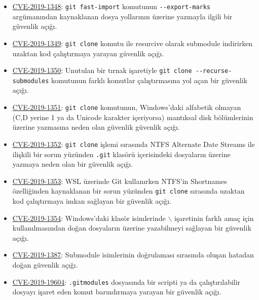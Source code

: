 \documentclass[11pt]{article}
\begin{document}
\begin{itemize}
\item \href{https://github.com/git/git/security/advisories/GHSA-2pw3-gwg9-8pqr}{CVE-2019-1348}: \texttt{git fast-import} komutunun \texttt{-{}-export-marks} argümanından
kaynaklanan dosya yollarının üzerine yazmayla ilgili bir güvenlik açığı.
\item \href{https://github.com/git/git/security/advisories/GHSA-4qvh-qvv7-frc7}{CVE-2019-1349}: \texttt{git clone} komutu ile resurcive olarak submodule indirirken
uzaktan kod çalıştırmaya yarayan güvenlik açığı.
\item \href{https://github.com/git/git/security/advisories/GHSA-44fr-r2hj-3f4x}{CVE-2019-1350}: Unutulan bir tırnak işaretiyle \texttt{git clone
    -{}-recurse-submodules} komutunun farklı komutlar çalıştırmasına yol açan bir
güvenlik açığı.
\item \href{https://github.com/git/git/security/advisories/GHSA-39hj-fvvf-mq4f}{CVE-2019-1351}: \texttt{git clone} komutunun, Windows'daki alfabetik olmayan (C,D
yerine 1 ya da Unicode karakter içeriyorsa) mantıksal disk bölümlerinin
üzerine yazmasına neden olan güvenlik güvenlik açığı.
\item \href{https://github.com/git/git/security/advisories/GHSA-5wph-8frv-58vj}{CVE-2019-1352}: \texttt{git clone} işlemi sırasında NTFS Alternate Date Streams ile
ilişkili bir sorun yüzünden \texttt{.git} klasörü içerisindeki dosyaların üzerine
yazmaya neden olan bir güvenlik açığı.
\item \href{https://github.com/git/git/security/advisories/GHSA-589j-mmg9-733v}{CVE-2019-1353}: WSL üzerinde Git kullanırken NTFS'in Shortnames özelliğinden
kaynaklanan bir sorun yüzünden \texttt{git clone} sırasında uzaktan kod çalıştırmaya
imkan sağlayan bir güvenlik açığı.
\item \href{https://github.com/git/git/security/advisories/GHSA-xjx4-8694-q2fq}{CVE-2019-1354}: Windows'daki klasör isimlerinde $\backslash$ işaretinin farklı amaç için
kullanılmasından doğan dosyaların üzerine yazabilmeyi sağlayan bir güvenlik
açığı.
\item \href{https://github.com/git/git/security/advisories/GHSA-4wfr-gwrh-8mj2}{CVE-2019-1387}: Submodule isimlerinin doğrulaması sırasında oluşan hatadan
doğan güvenlik açığı.
\item \href{https://github.com/git/git/security/advisories/GHSA-cj5c-9839-g2ch}{CVE-2019-19604}: \texttt{.gitmodules} dosyasında bir scripti ya da çalıştırılabilir
dosyayı işaret eden komut barındırmaya yarayan bir güvenlik açığı.
\end{itemize}
\end{document}
